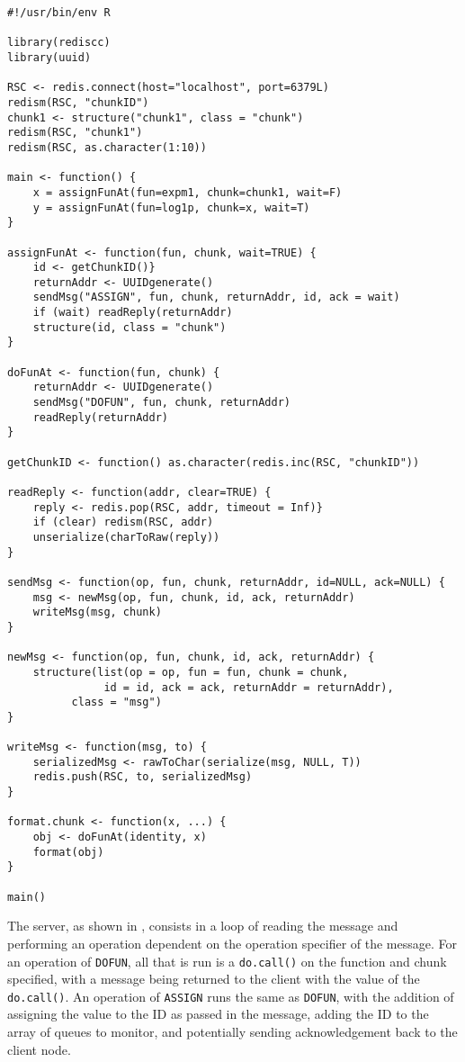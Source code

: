 \hypertarget{lst:ro-ass-client}{%
\label{lst:ro-ass-client}}%
\begin{verbatim}
#!/usr/bin/env R

library(rediscc)
library(uuid)

RSC <- redis.connect(host="localhost", port=6379L)
redism(RSC, "chunkID")
chunk1 <- structure("chunk1", class = "chunk")
redism(RSC, "chunk1")
redism(RSC, as.character(1:10))

main <- function() {
    x = assignFunAt(fun=expm1, chunk=chunk1, wait=F)
    y = assignFunAt(fun=log1p, chunk=x, wait=T)
}

assignFunAt <- function(fun, chunk, wait=TRUE) {
    id <- getChunkID()}
    returnAddr <- UUIDgenerate()
    sendMsg("ASSIGN", fun, chunk, returnAddr, id, ack = wait)
    if (wait) readReply(returnAddr)
    structure(id, class = "chunk")
}

doFunAt <- function(fun, chunk) {
    returnAddr <- UUIDgenerate()
    sendMsg("DOFUN", fun, chunk, returnAddr)
    readReply(returnAddr)
}

getChunkID <- function() as.character(redis.inc(RSC, "chunkID"))

readReply <- function(addr, clear=TRUE) {
    reply <- redis.pop(RSC, addr, timeout = Inf)}
    if (clear) redism(RSC, addr)
    unserialize(charToRaw(reply))
}

sendMsg <- function(op, fun, chunk, returnAddr, id=NULL, ack=NULL) {
    msg <- newMsg(op, fun, chunk, id, ack, returnAddr)
    writeMsg(msg, chunk)
}

newMsg <- function(op, fun, chunk, id, ack, returnAddr) {
    structure(list(op = op, fun = fun, chunk = chunk,
               id = id, ack = ack, returnAddr = returnAddr),
          class = "msg")
}

writeMsg <- function(msg, to) {
    serializedMsg <- rawToChar(serialize(msg, NULL, T))
    redis.push(RSC, to, serializedMsg)
}

format.chunk <- function(x, ...) {
    obj <- doFunAt(identity, x)
    format(obj)
}

main()
\end{verbatim}

The server, as shown in \cite{lst:ro-ass-server}, consists in a loop of
reading the message and performing an operation dependent on the
operation specifier of the message. For an operation of \texttt{DOFUN},
all that is run is a \texttt{do.call()} on the function and chunk
specified, with a message being returned to the client with the value of
the \texttt{do.call()}. An operation of \texttt{ASSIGN} runs the same as
\texttt{DOFUN}, with the addition of assigning the value to the ID as
passed in the message, adding the ID to the array of queues to monitor,
and potentially sending acknowledgement back to the client node.

